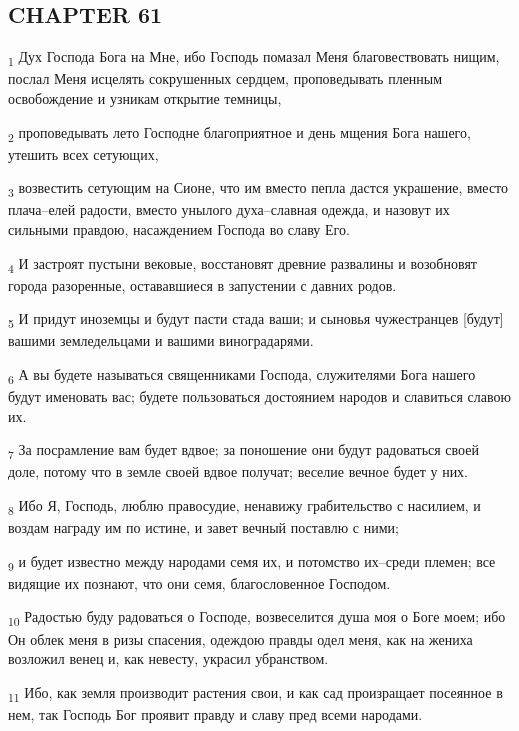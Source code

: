 \subsection{CHAPTER 61}
\begin{tcolorbox}
\textsubscript{1} Дух Господа Бога на Мне, ибо Господь помазал Меня благовествовать нищим, послал Меня исцелять сокрушенных сердцем, проповедывать пленным освобождение и узникам открытие темницы,
\end{tcolorbox}
\begin{tcolorbox}
\textsubscript{2} проповедывать лето Господне благоприятное и день мщения Бога нашего, утешить всех сетующих,
\end{tcolorbox}
\begin{tcolorbox}
\textsubscript{3} возвестить сетующим на Сионе, что им вместо пепла дастся украшение, вместо плача--елей радости, вместо унылого духа--славная одежда, и назовут их сильными правдою, насаждением Господа во славу Его.
\end{tcolorbox}
\begin{tcolorbox}
\textsubscript{4} И застроят пустыни вековые, восстановят древние развалины и возобновят города разоренные, остававшиеся в запустении с давних родов.
\end{tcolorbox}
\begin{tcolorbox}
\textsubscript{5} И придут иноземцы и будут пасти стада ваши; и сыновья чужестранцев [будут] вашими земледельцами и вашими виноградарями.
\end{tcolorbox}
\begin{tcolorbox}
\textsubscript{6} А вы будете называться священниками Господа, служителями Бога нашего будут именовать вас; будете пользоваться достоянием народов и славиться славою их.
\end{tcolorbox}
\begin{tcolorbox}
\textsubscript{7} За посрамление вам будет вдвое; за поношение они будут радоваться своей доле, потому что в земле своей вдвое получат; веселие вечное будет у них.
\end{tcolorbox}
\begin{tcolorbox}
\textsubscript{8} Ибо Я, Господь, люблю правосудие, ненавижу грабительство с насилием, и воздам награду им по истине, и завет вечный поставлю с ними;
\end{tcolorbox}
\begin{tcolorbox}
\textsubscript{9} и будет известно между народами семя их, и потомство их--среди племен; все видящие их познают, что они семя, благословенное Господом.
\end{tcolorbox}
\begin{tcolorbox}
\textsubscript{10} Радостью буду радоваться о Господе, возвеселится душа моя о Боге моем; ибо Он облек меня в ризы спасения, одеждою правды одел меня, как на жениха возложил венец и, как невесту, украсил убранством.
\end{tcolorbox}
\begin{tcolorbox}
\textsubscript{11} Ибо, как земля производит растения свои, и как сад произращает посеянное в нем, так Господь Бог проявит правду и славу пред всеми народами.
\end{tcolorbox}
